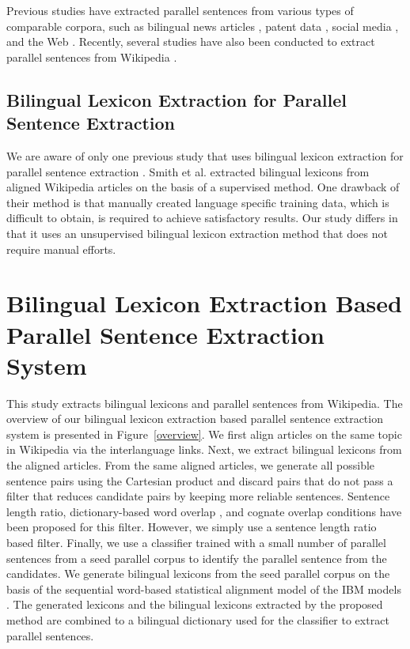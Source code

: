 \documentclass[english]{jnlp_1.4}
\begin{document}
Previous studies have extracted parallel sentences from various types of comparable corpora, 
such as bilingual news articles 
\cite{zhao:2002:IEEE,utiyama-isahara:2003:ACL,Munteanu:2005,tillmann:2009:Short,do:2010:EAMT,Abdul-RaufS11},
patent data \cite{utiyama:2007:MTS,Lu:2010:LREC}, social media \cite{ling-EtAl:2013:ACL2013},
and the Web \cite{Resnik:2003:WPC:964751.964753,jiang-EtAl:2009:ACLIJCNLP,hong-EtAl:2010:PAPERS}. 
Recently, several studies have also been conducted to extract parallel sentences from
Wikipedia \cite{Adafre:2006:EACL,smith-quirk-toutanova:2010:NAACLHLT,Stefanescu:2013:CICLing}.


\subsection{Bilingual Lexicon Extraction for Parallel Sentence Extraction}

We are aware of only one previous study that uses bilingual lexicon extraction for
parallel sentence extraction \cite{smith-quirk-toutanova:2010:NAACLHLT}.
Smith et al. \citeyear{smith-quirk-toutanova:2010:NAACLHLT} extracted
bilingual lexicons from aligned Wikipedia articles on the basis of a supervised method. 
One drawback of their method is that manually created language specific training data, 
which is difficult to obtain, is required to achieve satisfactory results. Our study differs 
in that it uses an unsupervised bilingual lexicon extraction method that does not require manual efforts.


\section{Bilingual Lexicon Extraction Based Parallel Sentence Extraction System}

This study extracts bilingual lexicons and parallel sentences from Wikipedia.
The overview of our bilingual lexicon extraction based parallel sentence extraction 
system is presented in Figure~\ref{overview}. We first align articles on the same topic 
in Wikipedia via the interlanguage links. Next, we extract bilingual lexicons from
the aligned articles. From the same aligned articles, we generate all possible sentence pairs
using the Cartesian product and discard pairs that do not pass a filter that reduces 
candidate pairs by keeping more reliable sentences.
Sentence length ratio, dictionary-based word overlap \cite{Munteanu:2005},
and cognate overlap conditions \cite{chu:2014:LREC} have been proposed for this filter.
However, we simply use a sentence length ratio based filter.
Finally, we use a classifier trained with a small number of parallel
sentences from a seed parallel corpus to identify the parallel 
sentence from the candidates. 
{We generate bilingual lexicons from the seed parallel corpus on the basis of
the sequential word-based statistical 
alignment model of the IBM models \cite{brown-EtAl:1993}.
The generated lexicons and} the bilingual lexicons extracted by the proposed method are combined to a 
bilingual dictionary used for the classifier to extract parallel sentences.
\end{document}
